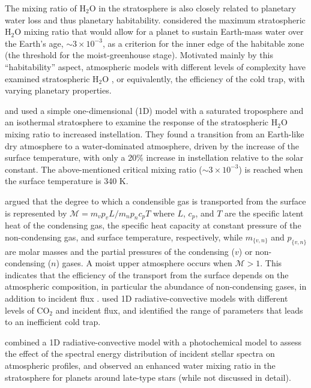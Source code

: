 \documentclass[11pt,numberedappendix,twocolappendix,]{emulateapj}
\def\water{H$_2$O }
\begin{document}
The mixing ratio of \water in the stratosphere is also closely related to planetary water loss and thus planetary habitability. 
\citet{Kasting1993} considered the maximum stratospheric \water mixing ratio that would allow for a planet to sustain Earth-mass water over the Earth's age, $\sim 3 \times 10^{-3}$, as a criterion for the inner edge of the habitable zone (the threshold for the moist-greenhouse stage). 
Motivated mainly by this ``habitability'' aspect, atmospheric models with different levels of complexity have examined stratospheric \water, or equivalently, the efficiency of the cold trap, with varying planetary properties. 

\citet{Kasting1993} and \citet{Kopparapu2013} used a simple one-dimensional (1D) model with a saturated troposphere and an isothermal stratosphere to examine the response of the stratospheric \water mixing ratio to increased instellation. 
They found a transition from an Earth-like dry atmosphere to a water-dominated atmosphere, driven by the increase of the surface temperature, with only a 20\% increase in instellation relative to the solar constant. 
The above-mentioned critical mixing ratio ($\sim 3 \times 10^{-3}$) is reached when the surface temperature is 340 K. 


\citet{Wordsworth2013,Wordsworth2014} argued that the degree to which a condensible gas is transported from the surface is represented by $\mathcal{M} = m_v p_v L / m_n p_n c_p T $ where $L$, $c_p$, and $T$ are the specific latent heat of the condensing gas, the specific heat capacity at constant pressure of the non-condensing gas, and surface  temperature, respectively, while $m_{\{v,n\}}$ and $p_{\{v,n\}}$ are molar masses and the partial pressures of the  condensing ($v$) or non-condensing ($n$) gases. 
A moist upper atmosphere occurs when $\mathcal{M} > 1$. 
This indicates that the efficiency of the transport from the surface depends on the atmospheric composition, in particular the abundance of non-condensing gases, in addition to incident flux \citep{Wordsworth2014}. 
\citet{Wordsworth2013} used 1D radiative-convective models with different levels of CO$_2$ and incident flux, and identified the range of parameters that leads to an inefficient cold trap. 

\citet{Rugheimer2013,Rugheimer2015} combined a 1D radiative-convective model with a photochemical model to assess the effect of the spectral energy distribution of incident stellar spectra on atmospheric profiles, and observed an enhanced water mixing ratio in the stratosphere for planets around late-type stars (while not discussed in detail). 
\end{document}
